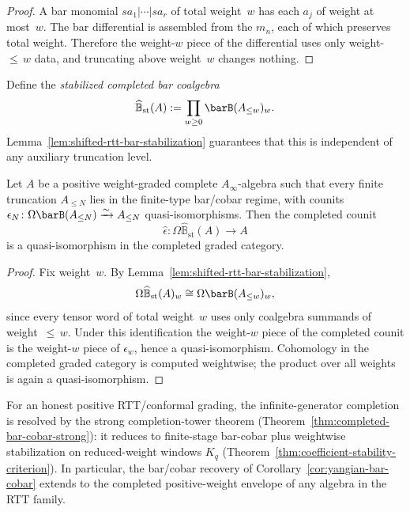 \begin{proof}
A bar monomial $sa_1 | \cdots | sa_r$ of total weight~$w$ has each
$a_j$ of weight at most~$w$. The bar differential is assembled from
the $m_n$, each of which preserves total weight. Therefore the
weight-$w$ piece of the differential uses only weight-${\le}\,w$
data, and truncating above weight~$w$ changes nothing.
\end{proof}

Define the \emph{stabilized completed bar coalgebra}
\[
\widehat{\mathbb{B}}_{\mathrm{st}}(A)
:= \prod_{w \ge 0} \barB(A_{\le w})_w.
\]
Lemma~\ref{lem:shifted-rtt-bar-stabilization} guarantees that
this is independent of any auxiliary truncation level.

\begin{theorem}
\label{thm:shifted-rtt-stabilized-recovery}
Let $A$ be a positive weight-graded complete $A_\infty$-algebra
such that every finite truncation $A_{\le N}$ lies in the finite-type
bar/cobar regime, with counits
$\epsilon_N \colon \Omega\barB(A_{\le N}) \xrightarrow{\sim} A_{\le N}$
quasi-isomorphisms. Then the completed counit
\[
\widehat{\epsilon} \colon
\Omega\widehat{\mathbb{B}}_{\mathrm{st}}(A) \longrightarrow A
\]
is a quasi-isomorphism in the completed graded category.
\end{theorem}

\begin{proof}
Fix weight~$w$. By
Lemma~\ref{lem:shifted-rtt-bar-stabilization},
\[
\Omega\widehat{\mathbb{B}}_{\mathrm{st}}(A)_w
\cong \Omega\barB(A_{\le w})_w,
\]
since every tensor word of total weight~$w$ uses only coalgebra
summands of weight~${\le}\,w$. Under this identification the
weight-$w$ piece of the completed counit is the weight-$w$ piece
of $\epsilon_w$, hence a quasi-isomorphism. Cohomology in the
completed graded category is computed weightwise; the product over
all weights is again a quasi-isomorphism.
\end{proof}

\begin{corollary}
\label{cor:shifted-rtt-tower-convergence}
For an honest positive RTT/conformal grading, the
infinite-generator completion is resolved by the strong
completion-tower theorem
(Theorem~\ref{thm:completed-bar-cobar-strong}): it reduces to
finite-stage bar-cobar plus weightwise stabilization on
reduced-weight windows $K_q$
(Theorem~\ref{thm:coefficient-stability-criterion}). In particular,
the bar/cobar recovery of
Corollary~\textup{\ref{cor:yangian-bar-cobar}} extends to the
completed positive-weight envelope of any algebra in the RTT family.
\end{corollary}

